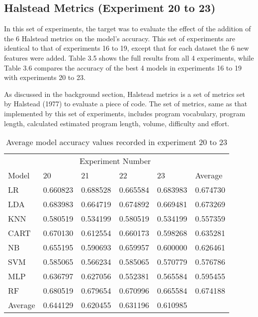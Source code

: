 \documentclass{report}
\begin{document}
\subsection{Halstead Metrics (Experiment 20 to 23)}

In this set of experiments, the target was to evaluate the effect of the addition of the 6 Halstead metrics on the model’s accuracy. This set of experiments are identical to that of experiments 16 to 19, except that for each dataset the 6 new features were added. Table 3.5 shows the full results from all 4 experiments, while Table 3.6 compares the accuracy of the best 4 models in experiments 16 to 19 with experiments 20 to 23.

As discussed in the background section, Halstead metrics is a set of metrics set by Halstead (1977) to evaluate a piece of code. The set of metrics, same as that implemented by this set of experiments, includes program vocabulary, program length, calculated estimated program length, volume, difficulty and effort.

\begin{table}[h!]
\centering
\begin{tabular}{l|llll|l}
\hline
& \multicolumn{4}{c|}{Experiment Number} & \\
Model & 20 & 21 & 22 & 23 & Average \\
\hline
LR & 0.660823 & 0.688528 & 0.665584 & 0.683983 & 0.674730 \\
LDA & 0.683983 & 0.664719 & 0.674892 & 0.669481 & 0.673269 \\
KNN & 0.580519 & 0.534199 & 0.580519 & 0.534199 & 0.557359 \\
CART & 0.670130 & 0.612554 & 0.660173 & 0.598268 & 0.635281 \\
NB & 0.655195 & 0.590693 & 0.659957 & 0.600000 & 0.626461 \\
SVM & 0.585065 & 0.566234 & 0.585065 & 0.570779 & 0.576786 \\
MLP & 0.636797 & 0.627056 & 0.552381 & 0.565584 & 0.595455 \\
RF & 0.680519 & 0.679654 & 0.670996 & 0.665584 & 0.674188 \\
\hline
Average & 0.644129 & 0.620455 & 0.631196 & 0.610985 \\
\hline
\end{tabular}
\caption{Average model accuracy values recorded in experiment 20 to 23}
\label{tab:3.5}
\end{table}
\end{document}
